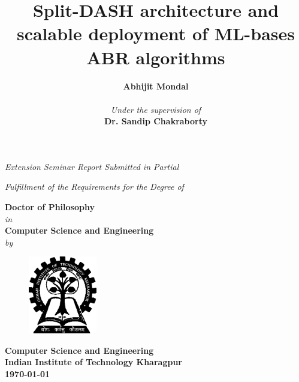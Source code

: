 \title{\bf{Split-DASH architecture and scalable deployment of ML-bases ABR algorithms}}
\date{}
\author{}
\maketitle
\thispagestyle{empty}
\begin{center}
	\vspace*{5mm}
	\textit{Extension Seminar Report Submitted in Partial}
	\par
	\vspace*{4mm}
	\textit{Fulfillment of the Requirements for the Degree of}
	\par
	\vspace*{5mm}
	{\large\textbf{Doctor of Philosophy}\\
		\vspace*{2mm}\textit{in}\\
		\vspace*{2mm}\large\textbf{Computer Science and Engineering}
		\\\vspace*{2mm}\textit{by}\\
		\vspace*{2mm}}
	\author{\large\textbf{Abhijit Mondal}\\
		\vspace*{2mm}{\small{[Roll No - 15CS91R09]}}\\
		\vspace*{15mm}\textit{Under the supervision of}\\
		\vspace*{2mm}\textbf{Dr. Sandip Chakraborty}\\}
	\vspace*{30mm}
	\begin{figure}[!ht]
		\centering
		\includegraphics[width=3cm]{img/iit_logo}
	\end{figure}
	\bf{Computer Science and Engineering
		\\Indian Institute of Technology Kharagpur
	}\\
	\today
\end{center}
\newpage